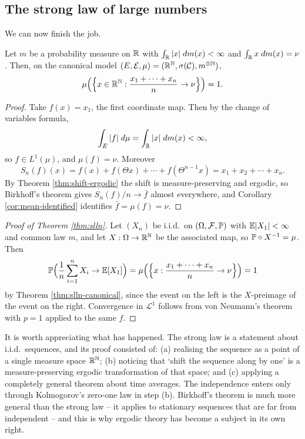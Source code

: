 \documentclass[a4paper]{scrartcl}
\newcommand{\cC}{\mathcal{C}}
\newcommand{\cE}{\mathcal{E}}
\newcommand{\cF}{\mathcal{F}}
\newcommand{\cL}{\mathcal{L}}
\begin{document}
\subsection{The strong law of large numbers}

We can now finish the job.

\begin{theorem}\label{thm:slln-canonical}
	Let $m$ be a probability measure on $\mathbb{R}$ with $\int_{\mathbb{R}}|x|\; d m(x)<\infty$ and $\int_{\mathbb{R}} x\; d m(x)=\nu$. Then, on the canonical model $(E,\cE,\mu)=(\R^\N,\sigma(\cC),m^{\otimes\N})$,
	$$
	\mu\Big(\Big\{ x \in \mathbb{R}^{\mathbb{N}} : \frac{x_1+\cdots+x_n}{n}\to\nu\Big\}\Big)=1.
	$$
\end{theorem}
\begin{proof}
	Take $f(x)=x_1$, the first coordinate map. Then by the change of variables formula,
	$$
	\int_E |f|\; d\mu = \int_{\mathbb{R}} |x|\; d m(x)<\infty,
	$$
	so $f \in L^1(\mu)$, and $\mu(f)=\nu$. Moreover
	$$
	S_n(f)(x)= f(x)+f(\Theta x)+\cdots+f(\Theta^{n-1}x)=x_1+x_2+\cdots+x_n.
	$$
	By Theorem \ref{thm:shift-ergodic} the shift is measure-preserving and ergodic, so Birkhoff's theorem gives $S_n(f)/n\to\bar f$ almost everywhere, and Corollary \ref{cor:mean-identified} identifies $\bar f = \mu(f)=\nu$.
\end{proof}

\begin{proof}[Proof of Theorem \ref{thm:slln}]
	Let $(X_n)$ be i.i.d.\ on $(\Omega,\cF,\PP)$ with $\mathbb{E}|X_1|<\infty$ and common law $m$, and let $X : \Omega \to \mathbb{R}^{\mathbb{N}}$ be the associated map, so $\mathbb{P}\circ X^{-1}=\mu$. Then
	$$
	\mathbb{P}\Big(\frac1n\sum_{i=1}^nX_i \to \mathbb{E}[X_1]\Big) = \mu\Big(\Big\{x : \frac{x_1+\cdots+x_n}{n}\to\nu\Big\}\Big)=1
	$$
	by Theorem \ref{thm:slln-canonical}, since the event on the left is the $X$-preimage of the event on the right. Convergence in $\cL^1$ follows from von Neumann's theorem with $p=1$ applied to the same $f$.
\end{proof}

\begin{remark}
	It is worth appreciating what has happened. The strong law is a statement about i.i.d.\ sequences, and its proof consisted of: (a) realising the sequence as a point of a single measure space $\mathbb{R}^{\mathbb{N}}$; (b) noticing that `shift the sequence along by one' is a measure-preserving ergodic transformation of that space; and (c) applying a completely general theorem about time averages. The independence enters only through Kolmogorov's zero-one law in step (b). Birkhoff's theorem is much more general than the strong law -- it applies to stationary sequences that are far from independent -- and this is why ergodic theory has become a subject in its own right.
\end{remark}
\end{document}
